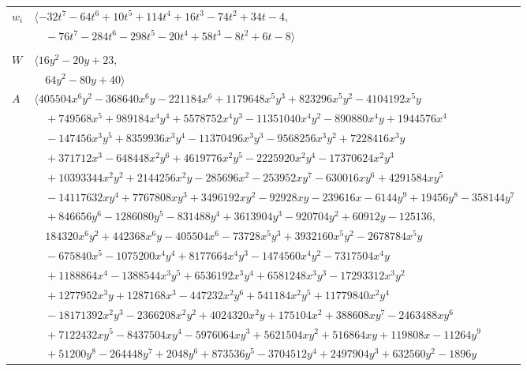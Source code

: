 \documentclass[11pt]{article}
\begin{document}
\begin{longtable}{@{}ll@{}}
$w_i$ & $\langle -32t^{7}-64t^{6}+10t^{5}+114t^{4}+16t^{3}-74t^{2}+34t-4,$\\
 & $\quad -76t^{7}-284t^{6}-298t^{5}-20t^{4}+58t^{3}-8t^{2}+6t-8\rangle$\\
\addlinespace[2pt]
\multicolumn{2}{@{}p{0.97\textwidth}@{}}{$i=38$, $D_i=8$, $\rho_{ij}$: $2{:}2, \allowbreak 4{:}2, \allowbreak 5{:}1, \allowbreak 7{:}1, \allowbreak 33{:}2, \allowbreak 45{:}2, \allowbreak 46{:}2$}\\
$W$ & $\langle 16y^{2}-20y+23,$\\
 & $\quad 64y^{2}-80y+40\rangle$\\
$A$ & $\langle 405504x^{6}y^{2}-368640x^{6}y-221184x^{6}+1179648x^{5}y^{3}+823296x^{5}y^{2}-4104192x^{5}y$\\
 & $\quad +749568x^{5}+989184x^{4}y^{4}+5578752x^{4}y^{3}-11351040x^{4}y^{2}-890880x^{4}y+1944576x^{4}$\\
 & $\quad -147456x^{3}y^{5}+8359936x^{3}y^{4}-11370496x^{3}y^{3}-9568256x^{3}y^{2}+7228416x^{3}y$\\
 & $\quad +371712x^{3}-648448x^{2}y^{6}+4619776x^{2}y^{5}-2225920x^{2}y^{4}-17370624x^{2}y^{3}$\\
 & $\quad +10393344x^{2}y^{2}+2144256x^{2}y-285696x^{2}-253952xy^{7}-630016xy^{6}+4291584xy^{5}$\\
 & $\quad -14117632xy^{4}+7767808xy^{3}+3496192xy^{2}-92928xy-239616x-6144y^{9}+19456y^{8}-358144y^{7}$\\
 & $\quad +846656y^{6}-1286080y^{5}-831488y^{4}+3613904y^{3}-920704y^{2}+60912y-125136,$\\
 & $\quad 184320x^{6}y^{2}+442368x^{6}y-405504x^{6}-73728x^{5}y^{3}+3932160x^{5}y^{2}-2678784x^{5}y$\\
 & $\quad -675840x^{5}-1075200x^{4}y^{4}+8177664x^{4}y^{3}-1474560x^{4}y^{2}-7317504x^{4}y$\\
 & $\quad +1188864x^{4}-1388544x^{3}y^{5}+6536192x^{3}y^{4}+6581248x^{3}y^{3}-17293312x^{3}y^{2}$\\
 & $\quad +1277952x^{3}y+1287168x^{3}-447232x^{2}y^{6}+541184x^{2}y^{5}+11779840x^{2}y^{4}$\\
 & $\quad -18171392x^{2}y^{3}-2366208x^{2}y^{2}+4024320x^{2}y+175104x^{2}+388608xy^{7}-2463488xy^{6}$\\
 & $\quad +7122432xy^{5}-8437504xy^{4}-5976064xy^{3}+5621504xy^{2}+516864xy+119808x-11264y^{9}$\\
 & $\quad +51200y^{8}-264448y^{7}+2048y^{6}+873536y^{5}-3704512y^{4}+2497904y^{3}+632560y^{2}-1896y$\\

\end{longtable}
\end{document}
